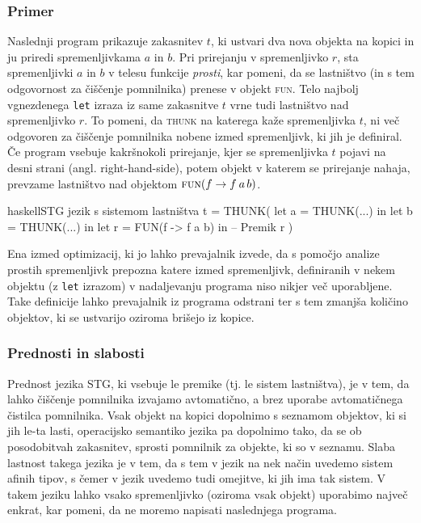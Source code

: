 \subsubsection{Primer}

Naslednji program prikazuje zakasnitev $t$, ki ustvari dva nova objekta na kopici in ju priredi spremenljivkama $a$ in $b$. Pri prirejanju v spremenljivko $r$, sta spremenljivki $a$ in $b$ v telesu funkcije \emph{prosti}, kar pomeni, da se lastništvo (in s tem odgovornost za čiščenje pomnilnika) prenese v objekt \textsc{fun}. Telo najbolj vgnezdenega \texttt{let} izraza iz same zakasnitve $t$ vrne tudi lastništvo nad spremenljivko $r$. To pomeni, da \textsc{thunk} na katerega kaže spremenljivka $t$, ni več odgovoren za čiščenje pomnilnika nobene izmed spremenljivk, ki jih je definiral. Če program vsebuje kakršnokoli prirejanje, kjer se spremenljivka $t$ pojavi na desni strani (angl. right-hand-side), potem objekt v katerem se prirejanje nahaja, prevzame lastništvo nad objektom $\textsc{fun}(f \to f \: a \, b)$.

\begin{code-box}{haskell}{STG jezik s sistemom lastništva \cmark}
t = THUNK(
    let a = THUNK(...)      in
    let b = THUNK(...)      in
    let r = FUN(f -> f a b) in  -- Premik
        r
)
\end{code-box}

Ena izmed optimizacij, ki jo lahko prevajalnik izvede, da s pomočjo analize prostih spremenljivk prepozna katere izmed spremenljivk, definiranih v nekem objektu (z \texttt{let} izrazom) v nadaljevanju programa niso nikjer več uporabljene. Take definicije lahko prevajalnik iz programa odstrani ter s tem zmanjša količino objektov, ki se ustvarijo oziroma brišejo iz kopice.

\subsubsection{Prednosti in slabosti}

Prednost jezika STG, ki vsebuje le premike (tj. le sistem lastništva), je v tem, da lahko čiščenje pomnilnika izvajamo avtomatično, a brez uporabe avtomatičnega čistilca pomnilnika. Vsak objekt na kopici dopolnimo s seznamom objektov, ki si jih le-ta lasti, operacijsko semantiko jezika pa dopolnimo tako, da se ob posodobitvah zakasnitev, sprosti pomnilnik za objekte, ki so v seznamu. Slaba lastnost takega jezika je v tem, da s tem v jezik na nek način uvedemo sistem afinih tipov, s čemer v jezik uvedemo tudi omejitve, ki jih ima tak sistem. V takem jeziku lahko vsako spremenljivko (oziroma vsak objekt) uporabimo največ enkrat, kar pomeni, da ne moremo napisati naslednjega programa.

